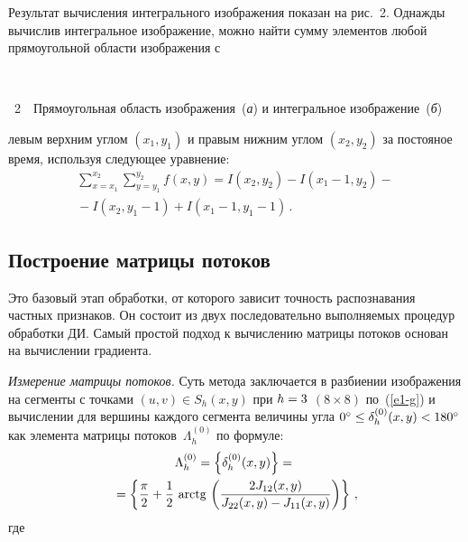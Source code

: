 \begin{multicols}{2}
  Результат вычисления интегрального изображения показан на рис.~2. 
Однажды вычислив интегральное изображение, можно найти сумму элементов 
любой прямоугольной области изображения с\linebreak\vspace*{-12pt}
\begin{center} %
\vspace*{4pt}
\mbox{%
 \epsfxsize=70.657mm
}
\end{center}
\vspace*{3pt}
{{\figurename~2}\ \ \small{Прямоугольная область изображения~(\textit{а}) и интегральное изображение~(\textit{б})}}
\vspace*{8pt}

\addtocounter{figure}{1}

\noindent
 левым верхним углом $(x_1, y_1)$ 
и правым нижним углом $(x_2, y_2)$ за постояное время, используя следующее 
уравнение:
  \begin{multline}
  \sum\limits_{x=x_1}^{x_2}\sum\limits_{y=y_1}^{y_2} f(x,y)=I(x_2,y_2)-I(x_1-
1,y_2)-{}\\
{}-I(x_2,y_1-1)+I(x_1-1,y_1-1)\,.
  \label{e7-g}
  \end{multline}



\subsection{Построение матрицы потоков} %
  
  Это базовый этап обработки, от которого зависит точность распознавания 
частных признаков. Он состоит из двух последовательно выполняемых 
процедур обработки ДИ. Самый простой подход к вы\-чис\-ле\-нию матрицы 
потоков основан на вы\-чис\-ле\-нии градиента.
  
  \textit{Измерение матрицы потоков.} Суть метода заключается в разбиении 
изображения на сегменты с точками $(u,v)\in S_h(x,y)$ при $h\hm=3$ $(8\times 8)$ 
по~(\ref{e1-g}) и вычислении для вершины каждого сегмента величины угла 
$0^\circ\leq \delta_h^{(0)}(x,y)\hm<180^\circ$ как элемента матрицы 
потоков~$\Lambda_h^{(0)}$ по формуле:
  \begin{multline*}
  \Lambda_h^{(0)} =\left\{ \delta_h^{(0)}(x,y)\right\} ={}\\
  {}= \left\{ 
\displaystyle\frac{\displaystyle \pi\mathstrut}{\displaystyle 2\mathstrut}+\displaystyle\frac{\displaystyle 1\mathstrut}{\displaystyle 2\mathstrut}\,\,\mathrm{arctg}\, \left( \displaystyle\frac{\displaystyle 2J_{12}(x,y)\mathstrut}{\displaystyle J_{22}(x,y)-
J_{11}(x,y)\mathstrut}\right)\right\}\,,
  \end{multline*}
где 


\end{multicols}
